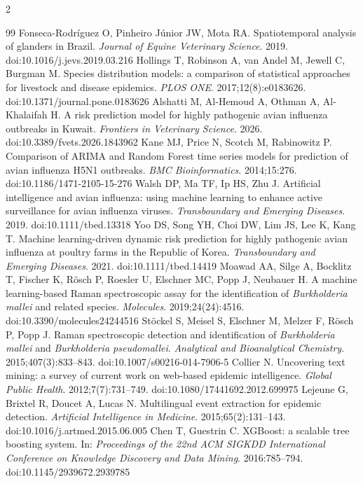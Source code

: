 \documentclass[11pt]{article}
\begin{document}
\begin{multicols}{2}
\begin{thebibliography}{99}
 Fonseca-Rodr\'iguez O, Pinheiro J\'unior JW, Mota RA. Spatiotemporal analysis of glanders in Brazil. \emph{Journal of Equine Veterinary Science}. 2019. doi:10.1016/j.jevs.2019.03.216
 Hollings T, Robinson A, van Andel M, Jewell C, Burgman M. Species distribution models: a comparison of statistical approaches for livestock and disease epidemics. \emph{PLOS ONE}. 2017;12(8):e0183626. doi:10.1371/journal.pone.0183626
 Alshatti M, Al-Hemoud A, Othman A, Al-Khalaifah H. A risk prediction model for highly pathogenic avian influenza outbreaks in Kuwait. \emph{Frontiers in Veterinary Science}. 2026. doi:10.3389/fvets.2026.1843962
 Kane MJ, Price N, Scotch M, Rabinowitz P. Comparison of ARIMA and Random Forest time series models for prediction of avian influenza H5N1 outbreaks. \emph{BMC Bioinformatics}. 2014;15:276. doi:10.1186/1471-2105-15-276
 Walsh DP, Ma TF, Ip HS, Zhu J. Artificial intelligence and avian influenza: using machine learning to enhance active surveillance for avian influenza viruses. \emph{Transboundary and Emerging Diseases}. 2019. doi:10.1111/tbed.13318
 Yoo DS, Song YH, Choi DW, Lim JS, Lee K, Kang T. Machine learning-driven dynamic risk prediction for highly pathogenic avian influenza at poultry farms in the Republic of Korea. \emph{Transboundary and Emerging Diseases}. 2021. doi:10.1111/tbed.14419
 Moawad AA, Silge A, Bocklitz T, Fischer K, R\"osch P, Roesler U, Elschner MC, Popp J, Neubauer H. A machine learning-based Raman spectroscopic assay for the identification of \emph{Burkholderia mallei} and related species. \emph{Molecules}. 2019;24(24):4516. doi:10.3390/molecules24244516
 St\"ockel S, Meisel S, Elschner M, Melzer F, R\"osch P, Popp J. Raman spectroscopic detection and identification of \emph{Burkholderia mallei} and \emph{Burkholderia pseudomallei}. \emph{Analytical and Bioanalytical Chemistry}. 2015;407(3):833--843. doi:10.1007/s00216-014-7906-5
 Collier N. Uncovering text mining: a survey of current work on web-based epidemic intelligence. \emph{Global Public Health}. 2012;7(7):731--749. doi:10.1080/17441692.2012.699975
 Lejeune G, Brixtel R, Doucet A, Lucas N. Multilingual event extraction for epidemic detection. \emph{Artificial Intelligence in Medicine}. 2015;65(2):131--143. doi:10.1016/j.artmed.2015.06.005
 Chen T, Guestrin C. XGBoost: a scalable tree boosting system. In: \emph{Proceedings of the 22nd ACM SIGKDD International Conference on Knowledge Discovery and Data Mining}. 2016:785--794. doi:10.1145/2939672.2939785

\end{thebibliography}
\end{multicols}
\end{document}
